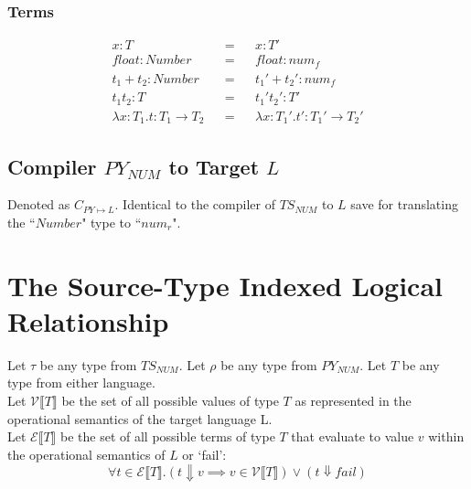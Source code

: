 \documentclass{article}
\newcommand{\denoteset}[2]{\mathcal{#1} \llbracket #2 \rrbracket}
\begin{document}
	\subsubsection{Terms}
	\begin{align*}
	x: T										&& = && x: T'\\
	float: Number							 	&& = && float: num_f\\
	t_1 + t_2: Number					 		&& = && t_1' + t_2': num_f\\
	t_1 t_2: T						 			&& = && t_1' t_2': T'\\
	\lambda x\colon T_1.t: T_1 \rightarrow T_2	&& = && \lambda x: T_1'.t': T_1' \rightarrow T_2'
	\end{align*}
	
	
	\subsection{Compiler $PY_{NUM}$ to Target $L$}
		Denoted as $C_{PY \mapsto L}$. Identical to the compiler of $TS_{NUM}$ to $L$ save for translating the ``$Number$" type to ``$num_r$".

	\section{The Source-Type Indexed Logical Relationship}
	
	Let $\tau$ be any type from $TS_{NUM}$. Let $\rho$ be any type from $PY_{NUM}$. Let $T$ be any type from either language.\\
	
	Let $\denoteset{V}{T}$ be the set of all possible values of type $T$ as represented in the operational semantics of the target language L.\\
	
	Let $\denoteset{E}{T}$ be the set of all possible terms of type $T$ that evaluate to value $v$ within the operational semantics of $L$ or `fail':
	\[
		\forall t \in \denoteset{E}{T}. (t \Downarrow v \implies v \in \denoteset{V}{T}) \lor (t \Downarrow fail)
	\]
\end{document}
